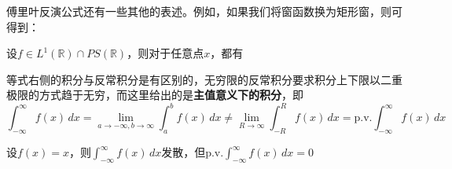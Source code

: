 傅里叶反演公式还有一些其他的表述。例如，如果我们将窗函数换为矩形窗，则可得到：
\begin{theorem}[傅里叶反演公式]
    设$f\in L^1(\mathbb{R})\cap PS(\mathbb{R})$，则对于任意点$x$，都有
\end{theorem}
等式右侧的积分与反常积分是有区别的，无穷限的反常积分要求积分上下限以二重极限的方式趋于无穷，而这里给出的是\textbf{主值意义下的积分}，即
\[\int_{-\infty}^{\infty}f(x)\,dx=\lim_{a\to-\infty,b\to\infty}\int_{a}^{b}f(x)\,dx\neq \lim_{R\to\infty}\int_{-R}^{R}f(x)\,dx=\text{p.v.}\int_{-\infty}^{\infty}f(x)\,dx\]
\begin{example}
    设$f(x)=x$，则$\int_{-\infty}^{\infty}f(x)\,dx$发散，但$\text{p.v.}\int_{-\infty}^{\infty}f(x)\,dx=0$
\end{example}
